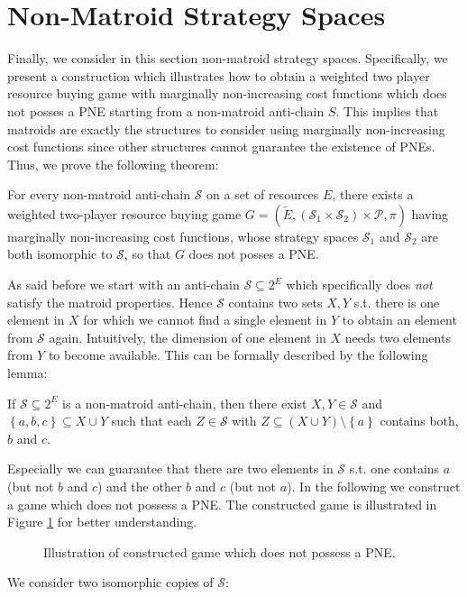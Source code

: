 \documentclass{scrartcl}
\theoremstyle{nonumberplain}
\newcommand{\tupel}[1]{\left(#1\right)}
\newcommand{\set}[1]{\left\{#1\right\}}
\begin{document}
\section{Non-Matroid Strategy Spaces}
Finally, we consider in this section non-matroid strategy spaces. Specifically,
we present a construction which illustrates how to obtain a weighted two player
resource buying game with marginally non-increasing cost functions which does
not posses a PNE starting from a non-matroid anti-chain $S$. This implies that
matroids are exactly the structures to consider using marginally non-increasing
cost functions since other structures cannot guarantee the existence of PNEs.
Thus, we prove the following theorem:
\begin{theo}
  For every non-matroid anti-chain $\mathcal{S}$ on a set of resources $E$,
  there exists a weighted two-player resource buying game
  $G = \tupel{\tilde{E},
    (\mathcal{S}_{1}\times \mathcal{S}_{2})\times\mathcal{P},\pi}$
  having marginally non-increasing cost functions, whose strategy spaces
  $\mathcal{S}_{1}$ and $\mathcal{S}_{2}$ are both isomorphic to $\mathcal{S}$,
  so that $G$ does not posses a PNE.
\end{theo}
As said before we start with an anti-chain $\mathcal{S}\subseteq 2^{E}$ which
specifically does \emph{not} satisfy the matroid properties. Hence
$\mathcal{S}$ contains two sets $X, Y$ s.t. there is one element in $X$ for
which we cannot find a single element in $Y$ to obtain an element from
$\mathcal{S}$ again. Intuitively, the dimension of one element in $X$ needs
two elements from $Y$ to become available. This can be formally described
by the following lemma:
\begin{lemma}
  If $\mathcal{S}\subseteq 2^{E}$ is a non-matroid anti-chain, then there exist
  $X,Y\in\mathcal{S}$ and $\set{a,b,c}\subseteq X\cup Y$ such that each
  $Z\in\mathcal{S}$ with $Z\subseteq(X\cup Y)\setminus\set{a}$ contains both,
  $b$ and $c$.
\end{lemma}
Especially we can guarantee that there are two elements in $\mathcal{S}$ s.t.
one contains $a$ (but not $b$ and $c$) and the other $b$ and $c$ (but not $a$).
In the following we construct a game which does not possess a PNE. The
constructed game is illustrated in Figure \ref{fig:game} for better
understanding.
\begin{figure}
  
  \caption{Illustration of constructed game which does not possess a PNE.}
  \label{fig:game}
\end{figure}
We consider two isomorphic copies of $\mathcal{S}$:
\end{document}
